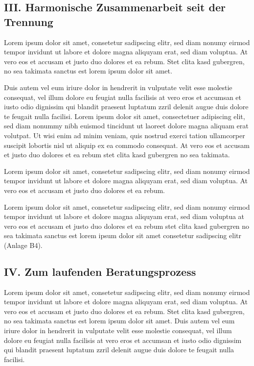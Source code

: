 \documentclass[
  11pt,
  a4paper,
]{article}
\begin{document}
\subsection{III. Harmonische Zusammenarbeit seit der
Trennung}\label{iii.-harmonische-zusammenarbeit-seit-der-trennung}

Lorem ipsum dolor sit amet, consetetur sadipscing elitr, sed diam nonumy
eirmod tempor invidunt ut labore et dolore magna aliquyam erat, sed diam
voluptua. At vero eos et accusam et justo duo dolores et ea rebum. Stet
clita kasd gubergren, no sea takimata sanctus est lorem ipsum dolor sit
amet.

Duis autem vel eum iriure dolor in hendrerit in vulputate velit esse
molestie consequat, vel illum dolore eu feugiat nulla facilisis at vero
eros et accumsan et iusto odio dignissim qui blandit praesent luptatum
zzril delenit augue duis dolore te feugait nulla facilisi. Lorem ipsum
dolor sit amet, consectetuer adipiscing elit, sed diam nonummy nibh
euismod tincidunt ut laoreet dolore magna aliquam erat volutpat. Ut wisi
enim ad minim veniam, quis nostrud exerci tation ullamcorper suscipit
lobortis nisl ut aliquip ex ea commodo consequat. At vero eos et accusam
et justo duo dolores et ea rebum stet clita kasd gubergren no sea
takimata.

Lorem ipsum dolor sit amet, consetetur sadipscing elitr, sed diam nonumy
eirmod tempor invidunt ut labore et dolore magna aliquyam erat, sed diam
voluptua. At vero eos et accusam et justo duo dolores et ea rebum.

Lorem ipsum dolor sit amet, consetetur sadipscing elitr, sed diam nonumy
eirmod tempor invidunt ut labore et dolore magna aliquyam erat, sed diam
voluptua at vero eos et accusam et justo duo dolores et ea rebum stet
clita kasd gubergren no sea takimata sanctus est lorem ipsum dolor sit
amet consetetur sadipscing elitr (Anlage B4).

\subsection{IV. Zum laufenden
Beratungsprozess}\label{iv.-zum-laufenden-beratungsprozess}

Lorem ipsum dolor sit amet, consetetur sadipscing elitr, sed diam nonumy
eirmod tempor invidunt ut labore et dolore magna aliquyam erat, sed diam
voluptua. At vero eos et accusam et justo duo dolores et ea rebum. Stet
clita kasd gubergren, no sea takimata sanctus est lorem ipsum dolor sit
amet. Duis autem vel eum iriure dolor in hendrerit in vulputate velit
esse molestie consequat, vel illum dolore eu feugiat nulla facilisis at
vero eros et accumsan et iusto odio dignissim qui blandit praesent
luptatum zzril delenit augue duis dolore te feugait nulla facilisi.
\end{document}
